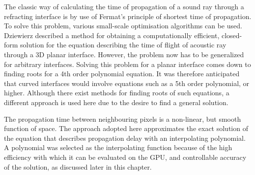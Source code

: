 The classic way of calculating the time of propagation of a sound ray through a refracting interface is by use of Fermat's principle of shortest time of propagation. To solve this problem, various small-scale optimisation algorithms can be used. Dziewierz described a method for obtaining a computationally efficient, closed-form solution for the equation describing the time of flight of acoustic ray through a 3D planar interface\cite{dziewierz_computationally_2013}. However, the problem now has to be generalized for arbitrary interfaces. Solving this problem for a planar interface comes down to finding roots for a 4th order polynomial equation. It was therefore anticipated that curved interfaces would involve equations such as a 5th order polynomial, or higher. Although there exist methods for finding roots of such equations\cite{wolfram_quintic}, a different approach is used here due to the desire to find a general solution.

The propagation time between neighbouring pixels is a non-linear, but smooth function of space. The approach adopted here approximates the exact solution of the equation that describes propagation delay with an interpolating polynomial. A polynomial was selected as the interpolating function because of the high efficiency with which it can be evaluated on the GPU, and controllable accuracy of the solution, as discussed later in this chapter.


